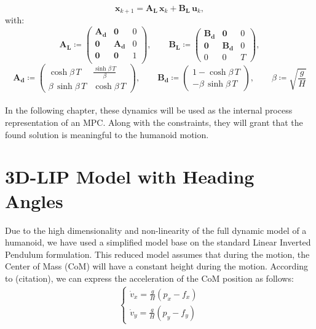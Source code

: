 \begin{equation}\label{eq:lip_dyanmics}
\mathbf{x}_{k+1} = \mathbf{A_L} \, \mathbf{x}_k + \mathbf{B_L} \, \mathbf{u}_k,
\end{equation}
with:
$$
\mathbf{A_L} \coloneqq 
\begin{pmatrix}
\mathbf{A_d} & \mathbf{0} & 0 \\
\mathbf{0} & \mathbf{A_d} & 0 \\
\mathbf{0} & \mathbf{0} & 1 \\
\end{pmatrix}, \qquad
\mathbf{B_L} \coloneqq 
\begin{pmatrix}
\mathbf{B_d} & \mathbf{0} & 0 \\
\mathbf{0} & \mathbf{B_d} & 0 \\
0 & 0 & T
\end{pmatrix},
$$
$$
\mathbf{A_d} \coloneqq 
\begin{pmatrix}
\cosh{\beta \, T} & \frac{\sinh{\beta \, T}}{\beta}  \\
\beta \, \sinh{\beta \, T} & \cosh{\beta \, T}
\end{pmatrix}, \qquad
\mathbf{B_d} \coloneqq 
\begin{pmatrix}
1 - \cosh{\beta \, T} \\
-\beta \, \sinh{\beta \, T}
\end{pmatrix}, \qquad
\beta \coloneqq \sqrt{\frac{g}{H}}
$$
\\
In the following chapter, these dynamics will be used as the internal process representation of an MPC. Along with the constraints, they will grant that the found solution is meaningful to the humanoid motion.


\section{3D-LIP Model with Heading Angles}
Due to the high dimensionality and non-linearity of the full dynamic model of a humanoid, we have used a simplified model base on the standard Linear Inverted Pendulum formulation.
This reduced model assumes that during the motion, the Center of Mass (CoM) will have a constant height during the motion.
According to (citation), we can express the acceleration of the CoM position as follows:
\begin{align}
    \begin{cases}
        \dot{v}_{x} = \frac{g}{H}(p_{x} - f_{x})
        \\[1ex]
        \dot{v}_{y} = \frac{g}{H}(p_{y} - f_{y})
    \end{cases}
\end{align}

